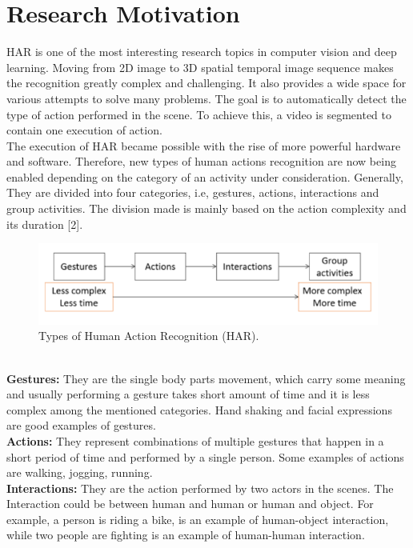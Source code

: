 \section{Research Motivation}
\hspace{5mm} HAR is one of the most interesting research topics in computer vision and deep learning. Moving from 2D image to 3D spatial temporal image sequence makes the recognition greatly complex and challenging. It also provides a wide space for various attempts to solve many problems. The goal is to automatically detect the type of action performed in the scene. To achieve this, a video is segmented to contain one execution of action.\\

The execution of HAR became possible with the rise of more powerful hardware and software. Therefore, new types of human actions recognition are now being enabled depending on the category of an activity under consideration. Generally, They are divided into four categories, i.e, gestures, actions, interactions and group activities. The division made is mainly based on the action complexity and its duration [2]. 
\begin{figure}[th]
\centering
\includegraphics{Figures/mh.PNG}
\decoRule
\caption[Types of Human Action Recognition "HAR"]{Types of Human Action Recognition (HAR).}
\label{fig:la}
\end{figure}\\

\textbf{Gestures:} They are the single body parts movement, which carry some meaning and usually performing a gesture takes short amount of time and it is less complex among the mentioned categories. Hand shaking and facial expressions are good examples of gestures.\\

\textbf{Actions:} They represent combinations of multiple gestures that happen in a short period of time and performed by a single person. Some examples of actions are walking, jogging, running.\\

\textbf{Interactions:} They are the action performed by two actors in the scenes. The Interaction could be between human and human or human and object. For example, a person is riding a bike, is an example of human-object interaction, while two people are fighting is an example of human-human interaction.\\

